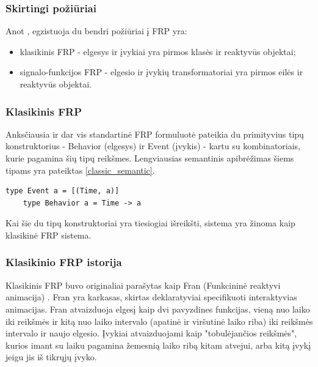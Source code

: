 

\subsubsection{Skirtingi požiūriai}

Anot \cite{Survey}, egzistuoja du bendri požiūriai į FRP yra:

\begin{itemize}

	\item klasikinis FRP - elgesys ir įvykiai yra pirmos klasės ir reaktyvūs objektai;

	\item signalo-funkcijos FRP - elgesio ir įvykių transformatoriai yra pirmos eilės ir reaktyvūs objektai.

\end{itemize}

\subsubsection{Klasikinis FRP}

Anksčiausia ir dar vis standartinė FRP formuluotė \cite{ElliottHudak97:Fran} pateikia du primityvius tipų konstruktorius - Behavior (elgesys) ir Event (įvykis) - kartu su kombinatoriais, kurie pagamina šių tipų reikšmes. Lengviausias semantinis apibrėžimas šiems tipams yra pateiktas \ref{classic_semantic}.

\begin{lstlisting}[caption=- klasikinio FRP semantiniai tipai, label=classic_semantic]
	type Event a = [(Time, a)]
	type Behavior a = Time -> a
\end{lstlisting} 

Kai šie du tipų konstruktoriai yra tiesiogiai išreikšti, sistema yra žinoma kaip klasikinė FRP sistema.

\subsubsection{Klasikinio FRP istorija}

Klasikinis FRP buvo originaliai parašytas kaip Fran (Funkcininė reaktyvi animacija) \cite{ElliottHudak97:Fran}. Fran yra karkasas, skirtas deklaratyviai specifikuoti interaktyvias animacijas. Fran atvaizduoja elgesį kaip dvi pavyzdines funkcijas, vieną nuo laiko iki reikšmės ir kitą nuo laiko intervalo (apatinė ir viršutinė laiko riba) iki reikšmės intervalo ir naujo elgesio. Įvykiai atvaizduojami kaip "tobulėjančios reikšmės", kurios imant su laiku pagamina žemesnią laiko ribą kitam atvejui, arba kitą įvykį jeigu jis iš tikrųjų įvyko.

